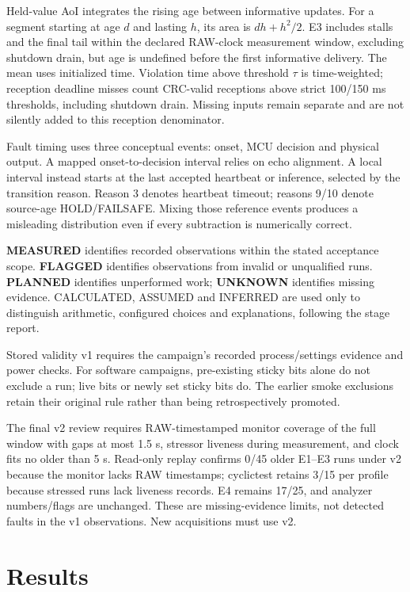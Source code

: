 \documentclass[a4paper,11pt]{article}
\newcommand{\page}{\clearpage}
\begin{document}
Held-value AoI integrates the rising age between informative updates. For a segment starting at age $d$ and lasting $h$, its area is $dh+h^2/2$. E3 includes stalls and the final tail within the declared RAW-clock measurement window, excluding shutdown drain, but age is undefined before the first informative delivery. The mean uses initialized time. Violation time above threshold $\tau$ is time-weighted; reception deadline misses count CRC-valid receptions above strict 100/150 ms thresholds, including shutdown drain. Missing inputs remain separate and are not silently added to this reception denominator.

Fault timing uses three conceptual events: onset, MCU decision and physical output. A mapped onset-to-decision interval relies on echo alignment. A local interval instead starts at the last accepted heartbeat or inference, selected by the transition reason. Reason 3 denotes heartbeat timeout; reasons 9/10 denote source-age HOLD/FAILSAFE. Mixing those reference events produces a misleading distribution even if every subtraction is numerically correct.

\textbf{MEASURED} identifies recorded observations within the stated acceptance scope. \textbf{FLAGGED} identifies observations from invalid or unqualified runs. \textbf{PLANNED} identifies unperformed work; \textbf{UNKNOWN} identifies missing evidence. CALCULATED, ASSUMED and INFERRED are used only to distinguish arithmetic, configured choices and explanations, following the stage report.

Stored validity v1 requires the campaign's recorded process/settings evidence and power checks. For software campaigns, pre-existing sticky bits alone do not exclude a run; live bits or newly set sticky bits do. The earlier smoke exclusions retain their original rule rather than being retrospectively promoted.

The final v2 review requires RAW-timestamped monitor coverage of the full window with gaps at most 1.5 s, stressor liveness during measurement, and clock fits no older than 5 s. Read-only replay confirms 0/45 older E1--E3 runs under v2 because the monitor lacks RAW timestamps; cyclictest retains 3/15 per profile because stressed runs lack liveness records. E4 remains 17/25, and analyzer numbers/flags are unchanged. These are missing-evidence limits, not detected faults in the v1 observations. New acquisitions must use v2.
\page
\section{Results}
\end{document}
